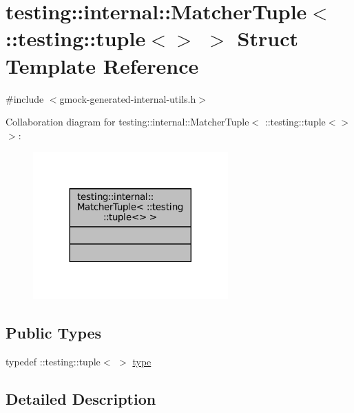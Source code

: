 \hypertarget{structtesting_1_1internal_1_1MatcherTuple_3_01_1_1testing_1_1tuple_3_4_01_4}{}\section{testing\+:\+:internal\+:\+:Matcher\+Tuple$<$ \+:\+:testing\+:\+:tuple$<$$>$ $>$ Struct Template Reference}
\label{structtesting_1_1internal_1_1MatcherTuple_3_01_1_1testing_1_1tuple_3_4_01_4}


{\ttfamily \#include $<$gmock-\/generated-\/internal-\/utils.\+h$>$}



Collaboration diagram for testing\+:\+:internal\+:\+:Matcher\+Tuple$<$ \+:\+:testing\+:\+:tuple$<$$>$ $>$\+:
\nopagebreak
\begin{figure}[H]
\begin{center}
\leavevmode
\includegraphics[width=212pt]{structtesting_1_1internal_1_1MatcherTuple_3_01_1_1testing_1_1tuple_3_4_01_4__coll__graph}
\end{center}
\end{figure}
\subsection*{Public Types}
\begin{DoxyCompactItemize}
\item 
typedef \+::testing\+::tuple$<$ $>$ \hyperlink{structtesting_1_1internal_1_1MatcherTuple_3_01_1_1testing_1_1tuple_3_4_01_4_a8d4493b2b299322e6c885dee5473ebd7}{type}
\end{DoxyCompactItemize}


\subsection{Detailed Description}
